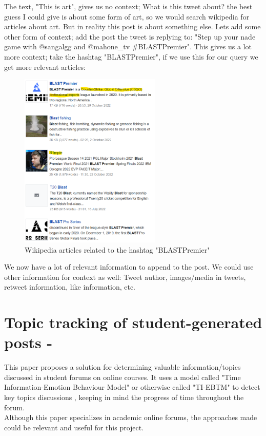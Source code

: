 The text, "This is art", gives us no context; What is this tweet about? the best guess I could give
is about some form of art, so we would search wikipedia for articles about art. But in reality this post is about something else.
Lets add some other form of context; add the post the tweet is replying to: "Step up your nade game with @sangalgg and @mahone\_tv
#BLASTPremier". This gives us a lot more context; take the hashtag "BLASTPremier", if we use this for our query we get more relevant
articles:
\newpage

\begin{figure}[htbp]
    \centering
    \includegraphics[width=0.6\textwidth]{../images/post-context-example.png}
    \caption{Wikipedia articles related to the hashtag "BLASTPremier"}
    \label{fig:blastpremier}
\end{figure}

We now have a lot of relevant information to append to the post. We could use other information for context as well: Tweet author,
images/media in tweets, retweet information, like information, etc.

\section{Topic tracking of student-generated posts - \cite{TopicTracking}}
This paper proposes a solution for determining valuable information/topics discussed in student forums on online courses.
It uses a model called "Time Information-Emotion Behaviour Model" or otherwise called "TI-EBTM" to detect key topics discussions
, keeping in mind the progress of time throughout the forum.\\
Although this paper specializes in academic online forums, the approaches made could be relevant and useful for this project.

